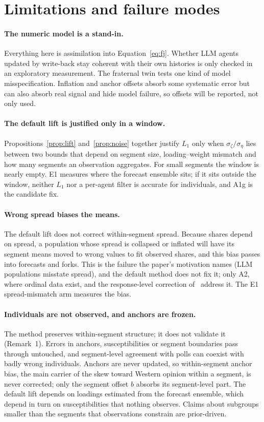 \documentclass[10pt]{article}
\theoremstyle{remark}
\begin{document}
\section{Limitations and failure modes}
\label{sec:limits}

\paragraph{The numeric model is a stand-in.} Everything here is assimilation into Equation~\eqref{eq:fj}. Whether LLM agents updated by write-back stay coherent with their own histories is only checked in an exploratory measurement. The fraternal twin tests one kind of model misspecification. Inflation and anchor offsets absorb some systematic error but can also absorb real signal and hide model failure, so offsets will be reported, not only used.

\paragraph{The default lift is justified only in a window.} Propositions~\ref{prop:lift} and~\ref{prop:noise} together justify $L_1$ only when $\sigma_\zeta/\sigma_\eta$ lies between two bounds that depend on segment size, loading--weight mismatch and how many segments an observation aggregates. For small segments the window is nearly empty. E1 measures where the forecast ensemble sits; if it sits outside the window, neither $L_1$ nor a per-agent filter is accurate for individuals, and A1g is the candidate fix.

\paragraph{Wrong spread biases the means.} The default lift does not correct within-segment spread. Because shares depend on spread, a population whose spread is collapsed or inflated will have its segment means moved to wrong values to fit observed shares, and this bias passes into forecasts and forks. This is the failure the paper's motivation names (LLM populations misstate spread), and the default method does not fix it; only A2, where ordinal data exist, and the response-level correction of~\cite{rw_variance} address it. The E1 spread-mismatch arm measures the bias.

\paragraph{Individuals are not observed, and anchors are frozen.} The method preserves within-segment structure; it does not validate it (Remark~1). Errors in anchors, susceptibilities or segment boundaries pass through untouched, and segment-level agreement with polls can coexist with badly wrong individuals. Anchors are never updated, so within-segment anchor bias, the main carrier of the skew toward Western opinion within a segment, is never corrected; only the segment offset $b$ absorbs its segment-level part. The default lift depends on loadings estimated from the forecast ensemble, which depend in turn on susceptibilities that nothing observes. Claims about subgroups smaller than the segments that observations constrain are prior-driven.
\end{document}
